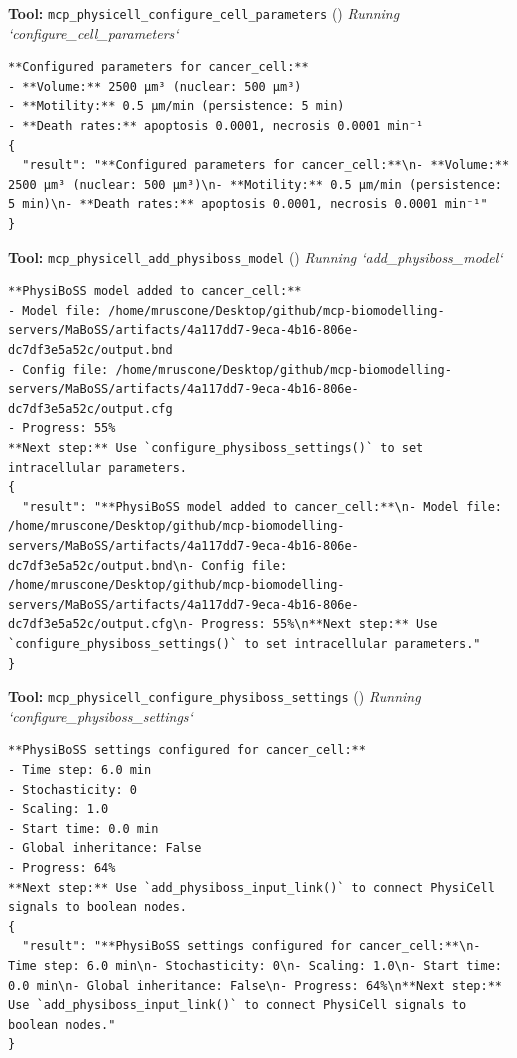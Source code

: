 \documentclass[11pt,a4paper]{article}
\begin{document}
\begin{toolokbox}
\textbf{Tool:} \texttt{mcp\_physicell\_configure\_cell\_parameters} (\checkmark)
\textit{Running `configure\_cell\_parameters`}
\begin{lstlisting}
**Configured parameters for cancer_cell:**
- **Volume:** 2500 μm³ (nuclear: 500 μm³)
- **Motility:** 0.5 μm/min (persistence: 5 min)
- **Death rates:** apoptosis 0.0001, necrosis 0.0001 min⁻¹
{
  "result": "**Configured parameters for cancer_cell:**\n- **Volume:** 2500 μm³ (nuclear: 500 μm³)\n- **Motility:** 0.5 μm/min (persistence: 5 min)\n- **Death rates:** apoptosis 0.0001, necrosis 0.0001 min⁻¹"
}
\end{lstlisting}
\end{toolokbox}
\begin{toolokbox}
\textbf{Tool:} \texttt{mcp\_physicell\_add\_physiboss\_model} (\checkmark)
\textit{Running `add\_physiboss\_model`}
\begin{lstlisting}
**PhysiBoSS model added to cancer_cell:**
- Model file: /home/mruscone/Desktop/github/mcp-biomodelling-servers/MaBoSS/artifacts/4a117dd7-9eca-4b16-806e-dc7df3e5a52c/output.bnd
- Config file: /home/mruscone/Desktop/github/mcp-biomodelling-servers/MaBoSS/artifacts/4a117dd7-9eca-4b16-806e-dc7df3e5a52c/output.cfg
- Progress: 55%
**Next step:** Use `configure_physiboss_settings()` to set intracellular parameters.
{
  "result": "**PhysiBoSS model added to cancer_cell:**\n- Model file: /home/mruscone/Desktop/github/mcp-biomodelling-servers/MaBoSS/artifacts/4a117dd7-9eca-4b16-806e-dc7df3e5a52c/output.bnd\n- Config file: /home/mruscone/Desktop/github/mcp-biomodelling-servers/MaBoSS/artifacts/4a117dd7-9eca-4b16-806e-dc7df3e5a52c/output.cfg\n- Progress: 55%\n**Next step:** Use `configure_physiboss_settings()` to set intracellular parameters."
}
\end{lstlisting}
\end{toolokbox}
\begin{toolokbox}
\textbf{Tool:} \texttt{mcp\_physicell\_configure\_physiboss\_settings} (\checkmark)
\textit{Running `configure\_physiboss\_settings`}
\begin{lstlisting}
**PhysiBoSS settings configured for cancer_cell:**
- Time step: 6.0 min
- Stochasticity: 0
- Scaling: 1.0
- Start time: 0.0 min
- Global inheritance: False
- Progress: 64%
**Next step:** Use `add_physiboss_input_link()` to connect PhysiCell signals to boolean nodes.
{
  "result": "**PhysiBoSS settings configured for cancer_cell:**\n- Time step: 6.0 min\n- Stochasticity: 0\n- Scaling: 1.0\n- Start time: 0.0 min\n- Global inheritance: False\n- Progress: 64%\n**Next step:** Use `add_physiboss_input_link()` to connect PhysiCell signals to boolean nodes."
}
\end{lstlisting}
\end{toolokbox}
\end{document}
